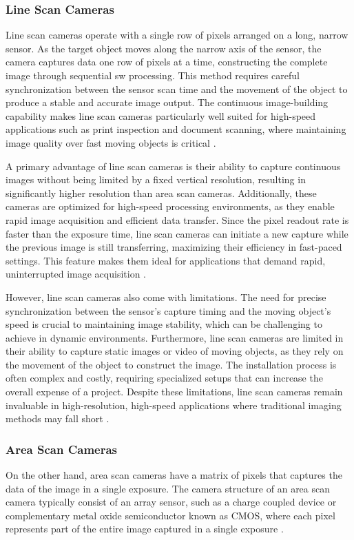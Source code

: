 \subsubsection{Line Scan Cameras}
Line scan cameras operate with a single row of pixels arranged on a long, narrow sensor. As the target object moves along the narrow axis of the sensor, the camera captures data one row of pixels at a time, constructing the complete image through sequential \gls{sw} processing. This method requires careful synchronization between the sensor scan time and the movement of the object to produce a stable and accurate image output. The continuous image-building capability makes line scan cameras particularly well suited for high-speed applications such as print inspection and document scanning, where maintaining image quality over fast moving objects is critical \cite{AS_VS_LS_ART}.

A primary advantage of line scan cameras is their ability to capture continuous images without being limited by a fixed vertical resolution, resulting in significantly higher resolution than area scan cameras. Additionally, these cameras are optimized for high-speed processing environments, as they enable rapid image acquisition and efficient data transfer. Since the pixel readout rate is faster than the exposure time, line scan cameras can initiate a new capture while the previous image is still transferring, maximizing their efficiency in fast-paced settings. This feature makes them ideal for applications that demand rapid, uninterrupted image acquisition \cite{AS_VS_LS_ART}.

However, line scan cameras also come with limitations. The need for precise synchronization between the sensor’s capture timing and the moving object’s speed is crucial to maintaining image stability, which can be challenging to achieve in dynamic environments. Furthermore, line scan cameras are limited in their ability to capture static images or video of moving objects, as they rely on the movement of the object to construct the image. The installation process is often complex and costly, requiring specialized setups that can increase the overall expense of a project. Despite these limitations, line scan cameras remain invaluable in high-resolution, high-speed applications where traditional imaging methods may fall short \cite{AS_VS_LS_ART}.

\subsubsection{Area Scan Cameras}
On the other hand, area scan cameras have a matrix of pixels that captures the data of the image in a single exposure. The camera structure of an area scan camera typically consist of an array sensor, such as a charge coupled device or complementary metal oxide semiconductor known as CMOS, where each pixel represents part of the entire image captured in a single exposure \cite{AS_VS_LS_ART}. 

